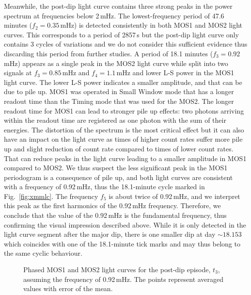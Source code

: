 \documentclass{aa}
\begin{document}
Meanwhile, the post-dip light curve contains three strong peaks in the
power spectrum at frequencies below 2\,mHz. 
The lowest-frequency period of 47.6 minutes ($f_2=0.35$\,mHz) is detected
consistently in both MOS1 and MOS2 light curves. This corresponds to a
period of 2857\,s but the post-dip light curve only contains
3 cycles of variations and we do not consider this sufficient evidence
thus discarding this period from further studies. A period of 18.1 minutes
($f_3=0.92$\,mHz) appears as a single peak in the MOS2 light curve while
split into two signals at $f_3=0.85$\,mHz and $f_4=1.1$\,mHz and lower
L-S power in the MOS1 light curve. The lower L-S power indicates a smaller
amplitude, and that can be due to pile up. MOS1 was operated in Small
Window mode that has a longer readout time than the Timing mode that was
used for the MOS2. The longer readout time for MOS1 can lead to stronger
pile up effects: two photons arriving within the readout time are registered
as one photon with the sum of their energies. The distortion of the
spectrum is the most critical effect but it can also have an impact on the
light curve as times of higher count rates suffer more pile up and slight
reduction of count rate compared to times of lower count rates. That can
reduce peaks in the light curve leading to a smaller amplitude in MOS1
compared to MOS2.
 We thus suspect the less significant peak in the MOS1 periodogram is a
consequence of pile up, and both light curves are consistent with a frequency
of 0.92\,mHz, thus the 18.1-minute cycle marked in Fig.~\ref{fig:xmmlc}.
The frequency $f_5$ is about twice of 0.92\,mHz, and we
interpret this peak as the first harmonics of the 0.92\,mHz frequency.
Therefore, we conclude that the value of the 0.92\,mHz is the fundamental
frequency, thus confirming the visual impression described above.
While it is only detected in the light curve segment after the
major dip, there is one smaller dip at day $\sim 18.153$ which coincides
with one of the 18.1-minute tick marks and may thus belong to the same
cyclic behaviour.\\


\begin{figure}
\caption{Phased MOS1 and MOS2 light curves for the post-dip episode,
$t_3$, assuming the frequency of 0.92\,mHz. The points represent averaged
values with error of the mean.}
\label{fig:phase}
\end{figure}
\end{document}
